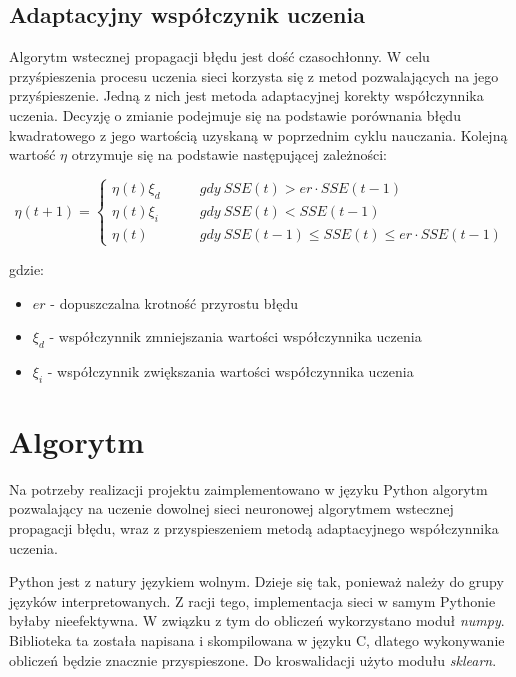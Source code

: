 \documentclass[12pt,twoside]{article}
\begin{document}
\subsection{Adaptacyjny współczynik uczenia}

Algorytm wstecznej propagacji błędu jest dość czasochłonny. W celu przyśpieszenia procesu uczenia sieci korzysta się z metod pozwalających na jego przyśpieszenie. Jedną z nich jest metoda adaptacyjnej korekty współczynnika uczenia. Decyzję o zmianie podejmuje się na podstawie porównania błędu kwadratowego z jego wartością uzyskaną w poprzednim cyklu nauczania. Kolejną wartość $\eta$ otrzymuje się na podstawie następującej zależności:

\begin{equation}
\eta (t + 1) =
\left\{\begin{aligned}
\eta (t)  \xi_d  & \qquad gdy\ SSE(t) > er \cdot SSE(t - 1)\\
\eta (t)  \xi_i  & \qquad gdy\ SSE(t) < SSE(t - 1)\\
\eta (t)   & \qquad gdy\ SSE(t - 1) \leq SSE(t) \leq er \cdot SSE(t - 1)
\end{aligned}\right.
\end{equation}

gdzie:
\begin{itemize}
\item $er$ - dopuszczalna krotność przyrostu błędu
\item $\xi_d$ - współczynnik zmniejszania wartości współczynnika uczenia
\item $\xi_i$ - współczynnik zwiększania wartości współczynnika uczenia
\end{itemize}
\clearpage

\section{Algorytm}

Na potrzeby realizacji projektu zaimplementowano w języku Python algorytm pozwalający na uczenie dowolnej sieci neuronowej algorytmem wstecznej propagacji błędu, wraz z przyspieszeniem metodą adaptacyjnego współczynnika uczenia. 

Python jest z natury językiem wolnym. Dzieje się tak, ponieważ należy do grupy języków interpretowanych. Z racji tego, implementacja sieci w samym Pythonie byłaby nieefektywna. W związku z tym do obliczeń wykorzystano moduł \textit{numpy}. Biblioteka ta została napisana i skompilowana w języku C, dlatego wykonywanie obliczeń będzie znacznie przyspieszone. Do kroswalidacji użyto modułu \textit{sklearn}.
\end{document}

